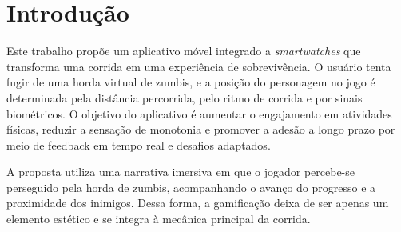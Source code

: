 \section{Introdução}

Este trabalho propõe um aplicativo móvel integrado a \textit{smartwatches} que transforma uma corrida em uma experiência de sobrevivência. O usuário tenta fugir de uma horda virtual de zumbis, e a posição do personagem no jogo é determinada pela distância percorrida, pelo ritmo de corrida e por sinais biométricos. O objetivo do aplicativo é aumentar o engajamento em atividades físicas, reduzir a sensação de monotonia e promover a adesão a longo prazo por meio de feedback em tempo real e desafios adaptados.

A proposta utiliza uma narrativa imersiva em que o jogador percebe-se perseguido pela horda de zumbis, acompanhando o avanço do progresso e a proximidade dos inimigos. Dessa forma, a gamificação deixa de ser apenas um elemento estético e se integra à mecânica principal da corrida.

